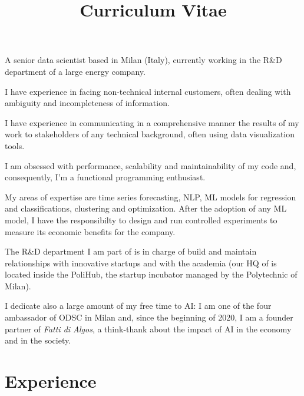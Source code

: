 \documentclass[11pt,a4paper,sans]{moderncv}        %
\title{Curriculum Vitae}                               %
\begin{document}
\makecvtitle
\small{A senior data scientist based in Milan (Italy), currently working in the R\&D department of a large energy company.

I have experience in facing non-technical internal customers, often dealing with ambiguity and incompleteness of information. 

I have experience in communicating in a comprehensive manner the results of my work to stakeholders of any technical background, often using data visualization tools. 

I am obsessed with performance, scalability and maintainability of my code and, consequently, I'm a functional programming enthusiast. 

My areas of expertise are time series forecasting, NLP,  ML models for regression and classifications, clustering and optimization. After the adoption of any ML model, I have the responsibilty to design and run controlled experiments to measure its economic benefits for the company.

The R\&D department I am part of is in charge of build and maintain relationships with innovative startups and with the academia (our HQ of is located inside the PoliHub, the startup incubator managed by the Polytechnic of Milan).

I dedicate also a large amount of my free time to AI: I am one of the four ambassador of ODSC in Milan and, since the beginning of 2020, I am a founder partner of \emph{Fatti di Algos}, a think-thank about the impact of AI in the economy and in the society.}

\section{Experience}
\end{document}
